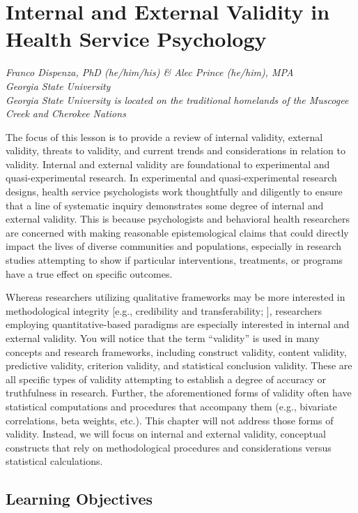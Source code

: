 \documentclass[
  11pt,
]{book}
\begin{document}
\chapter{Internal and External Validity in Health Service Psychology}\label{InExVal}

\emph{Franco Dispenza, PhD (he/him/his) \& Alec Prince (he/him), MPA}\\
\emph{Georgia State University}\\
\emph{Georgia State University is located on the traditional homelands of the Muscogee Creek and Cherokee Nations}

The focus of this lesson is to provide a review of internal validity, external validity, threats to validity, and current trends and considerations in relation to validity. Internal and external validity are foundational to experimental and quasi-experimental research. In experimental and quasi-experimental research designs, health service psychologists work thoughtfully and diligently to ensure that a line of systematic inquiry demonstrates some degree of internal and external validity. This is because psychologists and behavioral health researchers are concerned with making reasonable epistemological claims that could directly impact the lives of diverse communities and populations, especially in research studies attempting to show if particular interventions, treatments, or programs have a true effect on specific outcomes.

Whereas researchers utilizing qualitative frameworks may be more interested in methodological integrity {[}e.g., credibility and transferability; \citet{levitt_recommendations_2017}{]}, researchers employing quantitative-based paradigms are especially interested in internal and external validity. You will notice that the term ``validity'' is used in many concepts and research frameworks, including construct validity, content validity, predictive validity, criterion validity, and statistical conclusion validity. These are all specific types of validity attempting to establish a degree of accuracy or truthfulness in research. Further, the aforementioned forms of validity often have statistical computations and procedures that accompany them (e.g., bivariate correlations, beta weights, etc.). This chapter will not address those forms of validity. Instead, we will focus on internal and external validity, conceptual constructs that rely on methodological procedures and considerations versus statistical calculations.

\section{Learning Objectives}\label{learning-objectives-1}
\end{document}
